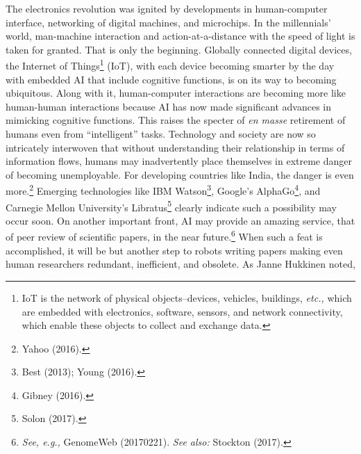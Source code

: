 \begin{multicols}{2}
{\parfillskip=0pt
The electronics revolution was ignited by developments in human-computer interface, networking of digital machines, and microchips. In the millennials' world, man-machine interaction and action-at-a-distance with the speed of light is taken for granted. That is only the beginning. Globally connected digital devices, the Internet of Things\footnote{IoT is the network of physical objects--devices, vehicles, buildings, \textit{etc.,} which are embedded with electronics, software, sensors, and network connectivity, which enable these objects to collect and exchange data.}  (IoT), with each device becoming smarter by the day with embedded AI that include cognitive functions, is on its way to becoming ubiquitous. Along with it, human-computer interactions are becoming more like human-human interactions because AI has now made significant advances in mimicking cognitive functions. This raises the specter of \textit{en masse} retirement of humans even from “intelligent” tasks. Technology and society are now so intricately interwoven that without understanding their relationship in terms of information flows, humans may inadvertently place themselves in extreme danger of becoming unemployable. For developing countries like India, the danger is even more.\footnote{Yahoo (2016).}  Emerging technologies like IBM Watson\footnote{Best (2013); Young (2016).}, Google's AlphaGo\footnote{Gibney (2016).}, and Carnegie Mellon University's Libratus\footnote{Solon (2017).} clearly indicate such a possibility may occur soon. On another important front, AI may provide an amazing service, that of peer review of scientific papers, in the near future.\footnote{\textit{See, e.g.,} GenomeWeb (20170221). \textit{See also:} Stockton (2017).}  When such a feat is accomplished, it will be but another step to robots writing papers making even human researchers redundant, inefficient, and obsolete. As Janne Hukkinen noted,\par}
\end{multicols}

